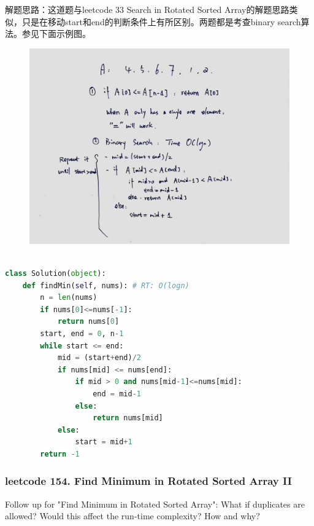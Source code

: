 \documentclass[a4paper,10pt]{article}
\begin{document}
\begin{CJK*}{UTF8}{gbsn}
\noindent 解题思路：这道题与leetcode 33 Search in Rotated Sorted Array的解题思路类似，只是在移动start和end的判断条件上有所区别。两题都是考查binary search算法。参见下面示例图。
\end{CJK*}

\begin{figure}[h]
    \includegraphics[width=\textwidth]{leetcode153.jpg}
    \centering \\
\end{figure}

\begin{lstlisting}[language=Python, caption=Problem153. Find Minimum in Rotated Sorted Array]

class Solution(object):
    def findMin(self, nums): # RT: O(logn)
        n = len(nums)
        if nums[0]<=nums[-1]:
            return nums[0]
        start, end = 0, n-1
        while start <= end:
            mid = (start+end)/2
            if nums[mid] <= nums[end]:
                if mid > 0 and nums[mid-1]<=nums[mid]:
                    end = mid-1
                else:
                    return nums[mid]
            else:
                start = mid+1
        return -1
\end{lstlisting}


\subsubsection{leetcode 154. Find Minimum in Rotated Sorted Array II}
Follow up for "Find Minimum in Rotated Sorted Array": What if duplicates are allowed? Would this affect the run-time complexity? How and why? \\
\end{document}
